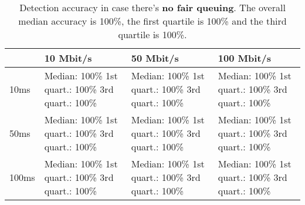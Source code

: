\documentclass[conference]{IEEEtran}
\begin{document}
\begin{table}
\begin{tabularx}{\columnwidth}{| l | X | X | X |}
\hline
& 10 Mbit/s & 50 Mbit/s & 100 Mbit/s \\ \hline
10ms & Median: 100\% \newline 1st quart.: 100\% \newline 3rd quart.: 100\% & Median: 100\% \newline 1st quart.: 100\% \newline 3rd quart.: 100\% & Median: 100\% \newline 1st quart.: 100\% \newline 3rd quart.: 100\%\\ \hline
50ms & Median: 100\% \newline 1st quart.: 100\% \newline 3rd quart.: 100\% & Median: 100\% \newline 1st quart.: 100\% \newline 3rd quart.: 100\% & Median: 100\% \newline 1st quart.: 100\% \newline 3rd quart.: 100\% \\ \hline
100ms & Median: 100\% \newline 1st quart.: 100\% \newline 3rd quart.: 100\% & Median: 100\% \newline 1st quart.: 100\% \newline 3rd quart.: 100\% & Median: 100\% \newline 1st quart.: 100\% \newline 3rd quart.: 100\% \\ \hline
\end{tabularx}
\caption{Detection accuracy in case there's \textbf{no fair queuing}.  The overall median accuracy is 100\%, the first quartile is 100\% and the third quartile is 100\%.}
\label{table:no_fq}
\end{table}
\end{document}
